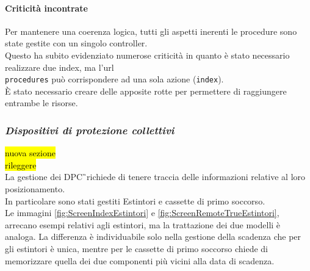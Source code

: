 			
		
	
	\paragraph{Criticità incontrate}
		Per mantenere una coerenza logica, tutti gli aspetti inerenti le procedure sono state gestite con un singolo controller.\\
		Questo ha subito evidenziato numerose criticità in quanto è stato necessario realizzare due index, ma l'url \texttt{\\procedures} può corrispondere ad una sola azione (\texttt{index}).\\
		È stato necessario creare delle apposite rotte per permettere di raggiungere entrambe le risorse.
\newpage
\subsubsection{\textit{Dispositivi di protezione collettivi}}
\hl{nuova sezione}\\
\hl{rileggere}\\
La gestione dei \gls{DPC}\G\ richiede di tenere traccia delle informazioni relative al loro posizionamento. \\
In particolare sono stati gestiti Estintori e cassette di primo soccorso. \\
Le immagini \autoref{fig:ScreenIndexEstintori} e \autoref{fig:ScreenRemoteTrueEstintori}, arrecano esempi relativi agli estintori, ma la trattazione dei due modelli è analoga. La differenza è individuabile solo nella gestione della scadenza che per gli estintori è unica, mentre per le cassette di primo soccorso chiede di memorizzare quella dei due componenti più vicini alla data di scadenza.

